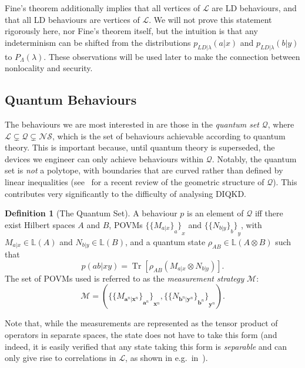 \documentclass[10pt, a4paper]{article}
\numberwithin{equation}{section} %
\newcounter{stmt} %
\theoremstyle{definition}
\newtheorem{defn}[stmt]{Definition}
\theoremstyle{plain}
\newcommand{\?}{\mathrel{?}} %
\newcommand{\Lin}[1]{\mathbb{L}\left(#1\right)}
\newcommand{\cvec}[1]{\boldsymbol{\mathbf{#1}}}    %
\newcommand{\Tr}[2][]{\mathop{\mathrm{Tr}#1}\left[ #2 \right]} %
\newcommand{\sM}{\mathcal{M}}
\newcommand{\Ls}{\mathcal{L}}
\newcommand{\Qs}{\mathcal{Q}}
\newcommand{\NSs}{\mathcal{NS}}
\begin{document}
    Fine's theorem additionally implies that all vertices of \(\Ls\) are LD behaviours, and that all LD behaviours are vertices of \(\Ls\). We will not prove this statement rigorously here, nor Fine's theorem itself, but the intuition is that any indeterminism can be shifted from the distributions \(p_{LD|\lambda}(a|x)\) and \(p_{LD|\lambda}(b|y)\) to \(P_{\Lambda}(\lambda)\). These observations will be used later to make the connection between nonlocality and security.

    \subsection{Quantum Behaviours}\label{sec:nl_Q}

    The behaviours we are most interested in are those in the \emph{quantum set} \(\Qs\), where \(\Ls \subsetneq \Qs \subsetneq \NSs\), which is the set of behaviours achievable according to quantum theory. This is important because, until quantum theory is superseded, the devices we engineer can only achieve behaviours within \(\Qs\). Notably, the quantum set is \emph{not} a polytope, with boundaries that are curved rather than defined by linear inequalities (see~\cite{QGeometry} for a recent review of the geometric structure of \(\Qs\)). This contributes very significantly to the difficulty of analysing DIQKD\@.

    \begin{defn}[The Quantum Set]
      A behaviour \(p\) is an element of \(\Qs\) iff there exist Hilbert spaces \(A\) and \(B\), POVMs \({\{{\{M_{a|x}\}}_a\}}_x\) and \({\{{\{N_{b|y}\}}_b\}}_y\), with \(M_{a|x} \in \Lin{A}\) and \(N_{b|y} \in \Lin{B}\), and a quantum state \(\rho_{AB} \in \Lin{A\otimes{B}}\) such that
      \begin{equation}\label{eqn:Qprob}
        p(ab|xy) = \Tr{\rho_{AB} \left(M_{a|x} \otimes N_{b|y}\right) }.
      \end{equation}
      The set of POVMs used is referred to as the \emph{measurement strategy} \(\sM\):
      \begin{equation} \sM = \left( {\{ {\{ M_{\cvec{a}^n|\cvec{x}^n}\}}_{\cvec{a}^n} \}}_{\cvec{x}^n}, {\{ {\{ N_{\cvec{b}^n|\cvec{y}^n}\}}_{\cvec{b}^n} \}}_{\cvec{y}^n} \right). \end{equation}
    \end{defn}
    Note that, while the measurements are represented as the tensor product of operators in separate spaces, the state does not have to take this form (and indeed, it is easily verified that any state taking this form is \emph{separable} and can only give rise to correlations in \(\Ls\), as shown in e.g.\ in~\cite[Ax. 3]{FiniteDimNonconvex}).
\end{document}
